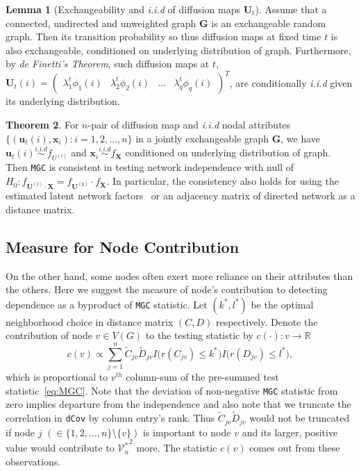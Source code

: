 \documentclass[11pt]{article}
\theoremstyle{definition}
\newtheorem{theorem}{Theorem}[section]
\newtheorem{lemma}[theorem]{Lemma}
\begin{document}
\begin{lemma}[Exchangeability and \textit{i.i.d} of diffusion maps $\mathbf{U}_{t}$]
	\label{main_lemma}
	Assume that a connected, undirected and unweighted graph $\mathbf{G}$ is an exchangeable random graph. Then its transition probability so thus diffusion maps at fixed time $t$ is also exchangeable, conditioned on underlying distribution of graph. Furthermore, by \textit{de Finetti's Theorem}, such diffusion maps at $t$, $\mathbf{U}_{t}(i) = \begin{pmatrix} \lambda^{t}_{1} \phi_{1}(i) & \lambda^{t}_{2} \phi_{2} (i)  & \ldots & \lambda^{t}_{q} \phi_{q}(i) \end{pmatrix}^{T}$, are conditionally \textit{i.i.d} given its underlying distribution.   
\end{lemma}
\begin{theorem}
	\label{theorem2}
	For $n$-pair of diffusion map and \textit{i.i.d} nodal attributes $\{ ( \mathbf{u}_{t}(i),  \mathbf{x}_{i}  ) : i =1,2, \ldots , n \}$ in a jointly exchangeable graph $\mathbf{G}$, we have $\mathbf{u}_{t}(i) \overset{i.i.d}{\sim} f_{U^{(t)}}$ and $\mathbf{x}_{i} \overset{i.i.d}{\sim} f_{\mathbf{X}}$ conditioned on underlying distribution of graph. 
	Then \texttt{MGC} is consistent in testing network independence with null of $H_{0}: f_{\mathbf{U}^{(t)} \cdot \mathbf{X}  }  = f_{\mathbf{U^{(t)}}} \cdot f_{\mathbf{X}}$. In particular, the consistency also holds for using the estimated latent network factors~\citep{fosdick2015testing} or an adjacency matrix of directed network as a distance matrix.
\end{theorem}

\subsection{Measure for Node Contribution}
On the other hand, some nodes often exert more reliance on their attributes than the others. Here we suggest the measure of node's contribution to detecting dependence as a byproduct of \texttt{MGC} statistic. Let $(k^{*}, l^{*})$ be the optimal neighborhood choice in distance matrix $(C, D)$ respectively. Denote the contribution of node $v \in V(G)$ to the testing statistic by  $c(\cdot) : v \rightarrow \mathbb{R}$
\begin{equation}
\label{contribution}
c(v) \propto \sum\limits_{j=1}^{n} \tilde{C}_{j v} \tilde{D}_{j v} I \big(  r (C_{j v}) \leq k^{*}  \big) I \big( r (D_{ j v }) \leq l^{*} \big), 
\end{equation}
which is proportional to $v^{th}$ column-sum of the pre-summed test statistic~\ref{eq:MGC}. Note that the deviation of non-negative \texttt{MGC} statistic from zero implies departure from the independence and also note that we truncate the correlation in \texttt{dCov} by column entry's rank. Thus $\tilde{C}_{jv} \tilde{D}_{jv}$ would not be truncated if node $j$ $(\in \{ 1,2, \ldots, n \} \setminus \{v \} )$ is important to node $v$ and its larger, positive value would contribute to ${\mathcal{V}^{*}_{n}}^2$ more. The statistic $c(v)$ comes out from these observations. 
\end{document}

